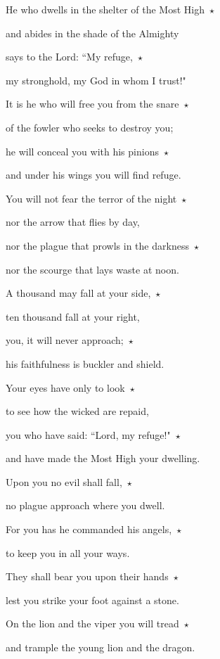 \noindent He who dwells in the shelter of the Most High~$\star$~\nopagebreak

and abides in the shade of the Almighty

\noindent says to the Lord: ``My refuge,~$\star$~\nopagebreak

my stronghold, my God in whom I trust!"

\noindent It is he who will free you from the snare~$\star$~\nopagebreak

of the fowler who seeks to destroy you;

\noindent he will conceal you with his pinions~$\star$~\nopagebreak

and under his wings you will find refuge.

\noindent You will not fear the terror of the night~$\star$~\nopagebreak

nor the arrow that flies by day,

\noindent nor the plague that prowls in the darkness~$\star$~\nopagebreak

nor the scourge that lays waste at noon.

\noindent A thousand may fall at your side,~$\star$~\nopagebreak

ten thousand fall at your right,

\noindent you, it will never approach;~$\star$~\nopagebreak

his faithfulness is buckler and shield.

\noindent Your eyes have only to look~$\star$~\nopagebreak

to see how the wicked are repaid,

\noindent you who have said: ``Lord, my refuge!"~$\star$~\nopagebreak

and have made the Most High your dwelling.

\noindent Upon you no evil shall fall,~$\star$~\nopagebreak

no plague approach where you dwell.

\noindent For you has he commanded his angels,~$\star$~\nopagebreak

to keep you in all your ways.

\noindent They shall bear you upon their hands~$\star$~\nopagebreak

lest you strike your foot against a stone.

\noindent On the lion and the viper you will tread~$\star$~\nopagebreak

and trample the young lion and the dragon.

